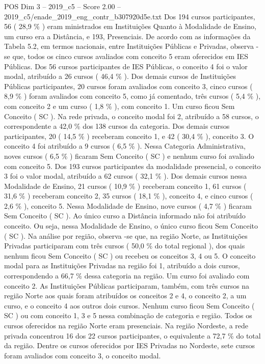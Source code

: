 \begin{textsample}{POS Dim 3 – 2019\_c5 – Score 2.00 – 2019\_c5/enade\_2019\_eng\_contr\_b307920d5e.txt}
Dos 194 cursos participantes, 56 ( 28,9 \% ) eram ministrados em Instituições Quanto à Modalidade de Ensino, um curso era a Distância, e 193, Presenciais.
De acordo com as informações da Tabela 5.2, em termos nacionais, entre Instituições Públicas e Privadas, observa -se que, todos os cinco cursos avaliados com conceito 5 eram oferecidos em IES Públicas.
Dos 56 cursos participantes de IES Públicas, o conceito 4 foi o valor modal, atribuído a 26 cursos ( 46,4 \% ).
Dos demais cursos de Instituições Públicas participantes, 20 cursos foram avaliados com conceito 3, cinco cursos ( 8,9 \% ) foram avaliados com conceito 5, como já comentado, três cursos ( 5,4 \% ), com conceito 2 e um curso ( 1,8 \% ), com conceito 1.
Um curso ficou Sem Conceito ( SC ).
Na rede privada, o conceito modal foi 2, atribuído a 58 cursos, o correspondente a 42,0 \% dos 138 cursos da categoria.
Dos demais cursos participantes, 20 ( 14,5 \% ) receberam conceito 1, e 42 ( 30,4 \% ), conceito 3.
O conceito 4 foi atribuído a 9 cursos ( 6,5 \% ).
Nessa Categoria Administrativa, noves cursos ( 6,5 \% ) ficaram Sem Conceito ( SC ) e nenhum curso foi avaliado com conceito 5.
Dos 193 cursos participantes da modalidade presencial, o conceito 3 foi o valor modal, atribuído a 62 cursos ( 32,1 \% ).
Dos demais cursos nessa Modalidade de Ensino, 21 cursos ( 10,9 \% ) receberam conceito 1, 61 cursos ( 31,6 \% ) receberam conceito 2, 35 cursos ( 18,1 \% ), conceito 4, e cinco cursos ( 2,6 \% ), conceito 5.
Nessa Modalidade de Ensino, nove cursos ( 4,7 \% ) ficaram Sem Conceito ( SC ).
Ao único curso a Distância informado não foi atribuído conceito.
Ou seja, nessa Modalidade de Ensino, o único curso ficou Sem Conceito ( SC ).
Na análise por região, observa -se que, na região Norte, as Instituições Privadas participaram com três cursos ( 50,0 \% do total regional ), dos quais nenhum ficou Sem Conceito ( SC ) ou recebeu os conceitos 3, 4 ou 5.
O conceito modal para as Instituições Privadas na região foi 1, atribuído a dois cursos, correspondendo a 66,7 \% dessa categoria na região.
Um curso foi avaliado com conceito 2.
As Instituições Públicas participaram, também, com três cursos na região Norte aos quais foram atribuídos os conceitos 2 e 4, o conceito 2, a um curso, e o conceito 4 aos outros dois cursos.
Nenhum curso ficou Sem Conceito ( SC ) ou com conceito 1, 3 e 5 nessa combinação de categoria e região.
Todos os cursos oferecidos na região Norte eram presenciais.
Na região Nordeste, a rede privada concentrou 16 dos 22 cursos participantes, o equivalente a 72,7 \% do total da região.
Dentre os cursos oferecidos por IES Privadas no Nordeste, sete cursos foram avaliados com conceito 3, o conceito modal.

\end{textsample}
